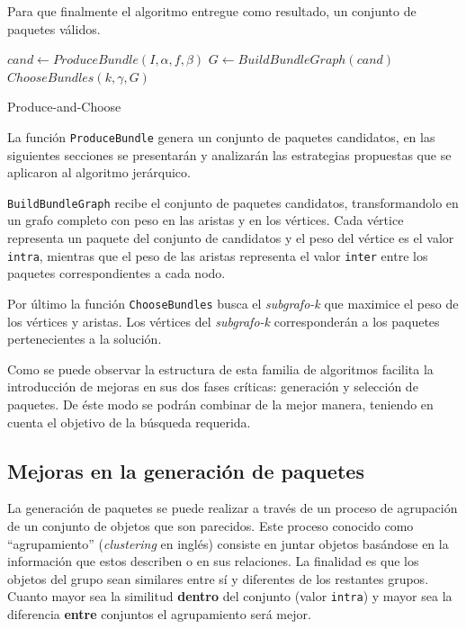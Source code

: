 Para que finalmente el algoritmo entregue como resultado, un conjunto de paquetes válidos.

\begin{center}
	\begin{algorithm}[H]
	\DontPrintSemicolon
	\SetAlgoLined
		$cand \leftarrow ProduceBundle(I,\alpha,f,\beta)$\;
		$G \leftarrow BuildBundleGraph(cand)$\;
		\Return $ChooseBundles(k,\gamma,G)$\;
	\caption{Produce-and-Choose}\label{alg:PAC}
	\end{algorithm}
\end{center}

La función \texttt{ProduceBundle} genera un conjunto de paquetes candidatos, en las siguientes secciones se presentarán y analizarán las estrategias propuestas que se aplicaron al algoritmo jerárquico.

\texttt{BuildBundleGraph} recibe el conjunto de paquetes candidatos, transformandolo en un grafo completo con peso en las aristas y en los vértices. Cada vértice representa un paquete del conjunto de candidatos y el peso del vértice es el valor \texttt{intra}, mientras que el peso de las aristas representa el valor \texttt{inter} entre los paquetes correspondientes a cada nodo. 

Por último la función \texttt{ChooseBundles} busca el \textit{subgrafo-k} que maximice el peso de los vértices y aristas. Los vértices del \textit{subgrafo-k} corresponderán a los paquetes pertenecientes a la solución.

Como se puede observar la estructura de esta familia de algoritmos facilita la introducción de mejoras en sus dos fases críticas: generación y selección de paquetes. De éste modo se podrán combinar de la mejor manera, teniendo en cuenta el objetivo de la búsqueda requerida.

\subsection{Mejoras en la generación de paquetes}
La generación de paquetes se puede realizar a través de un proceso de agrupación de un conjunto de objetos que son parecidos. Este proceso conocido como ``agrupamiento'' (\textit{clustering} en inglés) \cite{wiki:clustering} consiste en juntar objetos basándose en la información que estos describen o en sus relaciones. La finalidad es que los objetos del grupo sean similares entre sí y diferentes de los restantes grupos. Cuanto mayor sea la similitud \textbf{dentro} del conjunto (valor \texttt{intra}) y mayor sea la diferencia \textbf{entre} conjuntos el agrupamiento será mejor.


